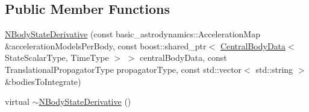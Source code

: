\subsection*{Public Member Functions}
\begin{DoxyCompactItemize}
\item 
\hyperlink{classtudat_1_1propagators_1_1NBodyStateDerivative_a9436969bd31800277db367e8fefb1f38}{N\+Body\+State\+Derivative} (const basic\+\_\+astrodynamics\+::\+Acceleration\+Map \&acceleration\+Models\+Per\+Body, const boost\+::shared\+\_\+ptr$<$ \hyperlink{classtudat_1_1propagators_1_1CentralBodyData}{Central\+Body\+Data}$<$ State\+Scalar\+Type, Time\+Type $>$ $>$ central\+Body\+Data, const Translational\+Propagator\+Type propagator\+Type, const std\+::vector$<$ std\+::string $>$ \&bodies\+To\+Integrate)
\item 
virtual \hyperlink{classtudat_1_1propagators_1_1NBodyStateDerivative_a350b843b4f15844b59b0187e00022313}{$\sim$\+N\+Body\+State\+Derivative} ()\hypertarget{classtudat_1_1propagators_1_1NBodyStateDerivative_a350b843b4f15844b59b0187e00022313}{}\label{classtudat_1_1propagators_1_1NBodyStateDerivative_a350b843b4f15844b59b0187e00022313}


\end{DoxyCompactItemize}
